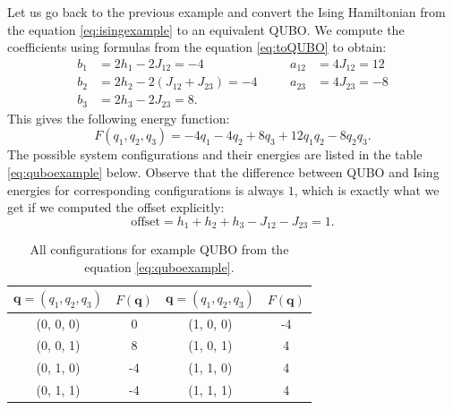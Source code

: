 \begin{example}
  Let us go back to the previous example and convert the Ising Hamiltonian from the equation \eqref{eq:isingexample}
  to an equivalent QUBO. We compute the coefficients using formulas from the equation \eqref{eq:toQUBO} to obtain:
  \begin{equation}
    \begin{alignedat}{6}
      b_{1} &= 2h_{1} - 2 J_{12} = -4            &\quad & a_{12} &= 4J_{12}=12\\
      b_{2} &= 2h_{2} - 2(J_{12} + J_{23}) = -4 &\quad & a_{23} &= 4J_{23}=-8\\
      b_{3} &= 2h_{3} - 2J_{23} = 8.             & & &
    \end{alignedat}
  \end{equation}
  This gives the following energy function:
  \begin{equation}
    \label{eq:quboexample}
    F(q_{1}, q_{2}, q_{3}) = -4q_{1} -4q_{2}+8q_{3}+12q_{1}q_{2}-8q_{2}q_{3}.
  \end{equation}
  The possible system configurations and their energies are listed in the table
  \ref{eq:quboexample} below. Observe that the difference between QUBO and Ising
  energies for corresponding configurations is always $1$, which is exactly what
  we get if we computed the offset explicitly:
  \begin{equation}
    \mbox{offset} = h_{1} + h_{2} + h_{3} - J_{12} - J_{23} = 1.
  \end{equation}

  \begin{table}[ht!]
    \begin{center}
      \begin{tabular}{|c|c||c|c|}
        \hline
        \rowcolor{theader}
        $\mathbf{q}=(q_1, q_2, q_3)$ &
        $F(\mathbf{q})$              &
        $\mathbf{q}=(q_1, q_2, q_3)$ &
        $F(\mathbf{q})$                                    \\\hline
        (0, 0, 0)                    & 0  & (1, 0, 0) & -4 \\ \hline
        (0, 0, 1)                    & 8  & (1, 0, 1) & 4  \\ \hline
        (0, 1, 0)                    & -4 & (1, 1, 0) & 4  \\ \hline
        (0, 1, 1)                    & -4 & (1, 1, 1) & 4  \\ \hline
      \end{tabular}
    \end{center}
    \caption{All configurations for example QUBO from the equation \eqref{eq:quboexample}.}
    \label{tab:quboexample}
  \end{table}

\end{example}

